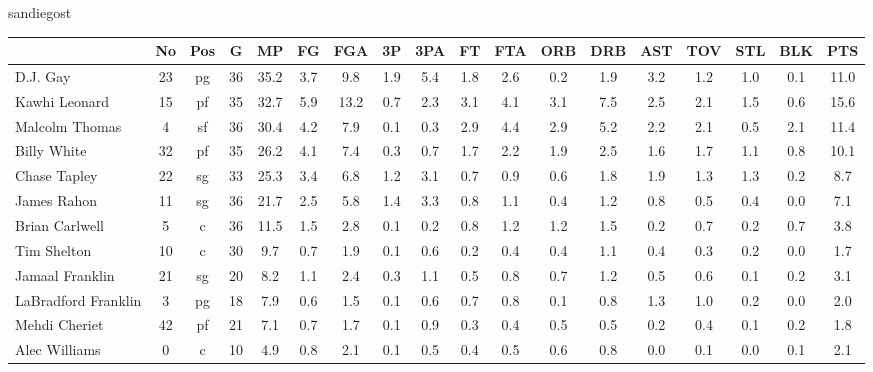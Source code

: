 \documentclass[10pt,letterpaper]{article}
\begin{document}
\begin{center}
sandiegost 
\end{center}
\begin{table}[ht]
\begin{center}
\begin{tabular}{lccccccccccccccccc}
  \hline
 & No & Pos & G & MP & FG & FGA & 3P & 3PA & FT & FTA & ORB & DRB & AST & TOV & STL & BLK & PTS \\ 
  \hline
D.J. Gay & 23 & pg & 36 & 35.2 & 3.7 & 9.8 & 1.9 & 5.4 & 1.8 & 2.6 & 0.2 & 1.9 & 3.2 & 1.2 & 1.0 & 0.1 & 11.0 \\ 
  Kawhi Leonard & 15 & pf & 35 & 32.7 & 5.9 & 13.2 & 0.7 & 2.3 & 3.1 & 4.1 & 3.1 & 7.5 & 2.5 & 2.1 & 1.5 & 0.6 & 15.6 \\ 
  Malcolm Thomas & 4 & sf & 36 & 30.4 & 4.2 & 7.9 & 0.1 & 0.3 & 2.9 & 4.4 & 2.9 & 5.2 & 2.2 & 2.1 & 0.5 & 2.1 & 11.4 \\ 
  Billy White & 32 & pf & 35 & 26.2 & 4.1 & 7.4 & 0.3 & 0.7 & 1.7 & 2.2 & 1.9 & 2.5 & 1.6 & 1.7 & 1.1 & 0.8 & 10.1 \\ 
  Chase Tapley & 22 & sg & 33 & 25.3 & 3.4 & 6.8 & 1.2 & 3.1 & 0.7 & 0.9 & 0.6 & 1.8 & 1.9 & 1.3 & 1.3 & 0.2 & 8.7 \\ 
  James Rahon & 11 & sg & 36 & 21.7 & 2.5 & 5.8 & 1.4 & 3.3 & 0.8 & 1.1 & 0.4 & 1.2 & 0.8 & 0.5 & 0.4 & 0.0 & 7.1 \\ 
  Brian Carlwell & 5 & c & 36 & 11.5 & 1.5 & 2.8 & 0.1 & 0.2 & 0.8 & 1.2 & 1.2 & 1.5 & 0.2 & 0.7 & 0.2 & 0.7 & 3.8 \\ 
  Tim Shelton & 10 & c & 30 & 9.7 & 0.7 & 1.9 & 0.1 & 0.6 & 0.2 & 0.4 & 0.4 & 1.1 & 0.4 & 0.3 & 0.2 & 0.0 & 1.7 \\ 
  Jamaal Franklin & 21 & sg & 20 & 8.2 & 1.1 & 2.4 & 0.3 & 1.1 & 0.5 & 0.8 & 0.7 & 1.2 & 0.5 & 0.6 & 0.1 & 0.2 & 3.1 \\ 
  LaBradford Franklin & 3 & pg & 18 & 7.9 & 0.6 & 1.5 & 0.1 & 0.6 & 0.7 & 0.8 & 0.1 & 0.8 & 1.3 & 1.0 & 0.2 & 0.0 & 2.0 \\ 
  Mehdi Cheriet & 42 & pf & 21 & 7.1 & 0.7 & 1.7 & 0.1 & 0.9 & 0.3 & 0.4 & 0.5 & 0.5 & 0.2 & 0.4 & 0.1 & 0.2 & 1.8 \\ 
  Alec Williams & 0 & c & 10 & 4.9 & 0.8 & 2.1 & 0.1 & 0.5 & 0.4 & 0.5 & 0.6 & 0.8 & 0.0 & 0.1 & 0.0 & 0.1 & 2.1 \\ 
   \hline
\end{tabular}
\end{center}
\end{table}
\end{document}
